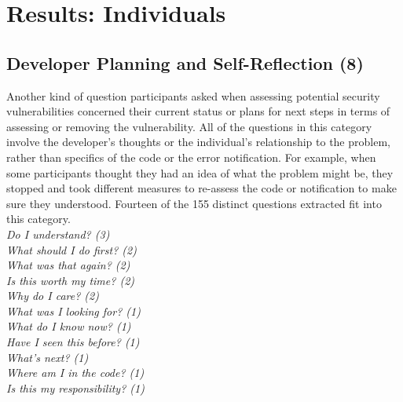 \documentclass[conference]{IEEEtran}
\begin{document}


\section{Results: Individuals}
\label{sec:results-i}



\noindent\subsection{\textbf{Developer Planning and Self-Reflection (8)}} \label{dpr}

Another kind of question participants asked when assessing potential security vulnerabilities concerned their current status or plans for next steps in terms of assessing or removing the vulnerability. 
All of the questions in this category involve the developer's thoughts or the individual's relationship to the problem, rather than specifics of the code or the error notification.
For example, when some participants thought they had an idea of what the problem might be, they stopped and took different measures to re-assess the code or notification to make sure they understood.
Fourteen of the 155 distinct questions extracted fit into this category. 
\\

\noindent\emph{Do I understand? (3)} \\
\emph{What should I do first? (2)} \\
\emph{What was that again? (2)} \\
\emph{Is this worth my time? (2)} \\
\emph{Why do I care? (2)} \\
\emph{What was I looking for? (1)} \\
\emph{What do I know now? (1)} \\
\emph{Have I seen this before? (1)} \\
\emph{What's next? (1)} \\
\emph{Where am I in the code? (1)} \\
\emph{Is this my responsibility? (1)} \\
\end{document}
